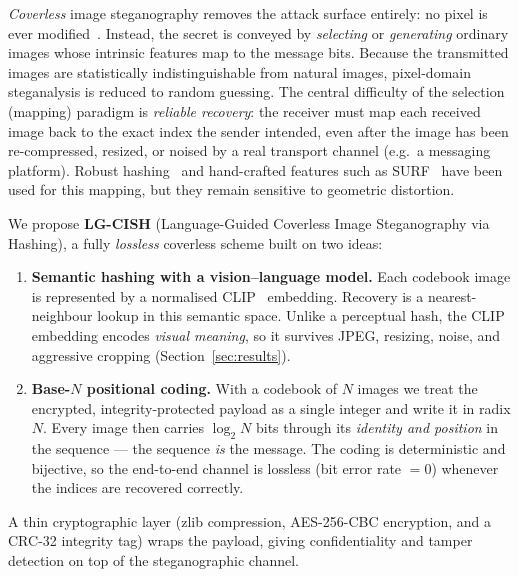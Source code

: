 \documentclass[10pt]{article}
\begin{document}
\emph{Coverless} image steganography removes the attack surface entirely: no
pixel is ever modified~\cite{zhou2015,coverlessSurvey2024}. Instead, the secret
is conveyed by \emph{selecting} or \emph{generating} ordinary images whose
intrinsic features map to the message bits. Because the transmitted images are
statistically indistinguishable from natural images, pixel-domain steganalysis
is reduced to random guessing. The central difficulty of the selection (mapping)
paradigm is \emph{reliable recovery}: the receiver must map each received image
back to the exact index the sender intended, even after the image has been
re-compressed, resized, or noised by a real transport channel (e.g.\ a messaging
platform). Robust hashing~\cite{zhou2015,end2endHash2023} and hand-crafted
features such as SURF~\cite{surf2024} have been used for this mapping, but they
remain sensitive to geometric distortion.

We propose \textbf{LG-CISH} (Language-Guided Coverless Image Steganography via
Hashing), a fully \emph{lossless} coverless scheme built on two ideas:
\begin{enumerate}
  \item \textbf{Semantic hashing with a vision--language model.} Each codebook
        image is represented by a normalised CLIP~\cite{radford2021} embedding.
        Recovery is a nearest-neighbour lookup in this semantic space. Unlike a
        perceptual hash, the CLIP embedding encodes \emph{visual meaning}, so it
        survives JPEG, resizing, noise, and aggressive cropping (Section~\ref{sec:results}).
  \item \textbf{Base-$N$ positional coding.} With a codebook of $N$ images we
        treat the encrypted, integrity-protected payload as a single integer and
        write it in radix $N$. Every image then carries $\log_2 N$ bits through
        its \emph{identity and position} in the sequence --- the sequence
        \emph{is} the message. The coding is deterministic and bijective, so the
        end-to-end channel is lossless (bit error rate $=0$) whenever the indices
        are recovered correctly.
\end{enumerate}
A thin cryptographic layer (zlib compression, AES-256-CBC encryption, and a
CRC-32 integrity tag) wraps the payload, giving confidentiality and tamper
detection on top of the steganographic channel.
\end{document}
